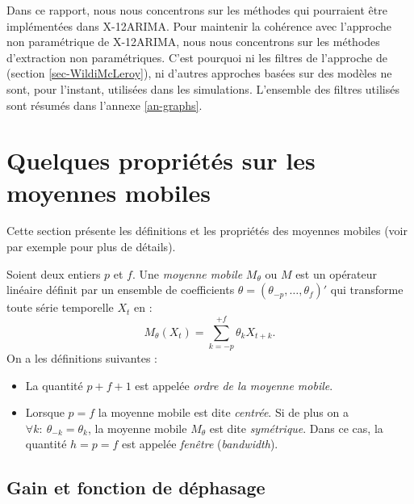 \documentclass[
  11pt,
  french,
  a4paper]{article}
\newcommand\1{\mathds{1}}
\begin{document}
Dans ce rapport, nous nous concentrons sur les méthodes qui pourraient être implémentées dans X-12ARIMA.
Pour maintenir la cohérence avec l'approche non paramétrique de X-12ARIMA, nous nous concentrons sur les méthodes d'extraction non paramétriques.
C'est pourquoi ni les filtres de l'approche de \textcite{trilemmaWMR2019} (section \ref{sec-WildiMcLeroy}), ni d'autres approches basées sur des modèles ne sont, pour l'instant, utilisées dans les simulations.
L'ensemble des filtres utilisés sont résumés dans l'annexe \ref{an-graphs}.

\hypertarget{sec-propMM}{%
\section{Quelques propriétés sur les moyennes mobiles}\label{sec-propMM}}

Cette section présente les définitions et les propriétés des moyennes mobiles (voir par exemple \textcite{ch12HBSA} pour plus de détails).

Soient deux entiers \(p\) et \(f\).
Une \emph{moyenne mobile} \(M_\theta\) ou \(M\) est un opérateur linéaire définit par un ensemble de coefficients \(\theta=(\theta_{-p},\dots,\theta_{f})'\) qui transforme toute série temporelle \(X_t\) en :
\[
M_\theta(X_t)=\sum_{k=-p}^{+f}\theta_kX_{t+k}.
\]
On a les définitions suivantes :

\begin{itemize}
\item
  La quantité \(p+f+1\) est appelée \emph{ordre de la moyenne mobile}.
\item
  Lorsque \(p=f\) la moyenne mobile est dite \emph{centrée}.
  Si de plus on a \(\forall k:\:\theta_{-k} = \theta_k\), la moyenne mobile \(M_\theta\) est dite \emph{symétrique}.
  Dans ce cas, la quantité \(h=p=f\) est appelée \emph{fenêtre} (\emph{bandwidth}).
\end{itemize}

\hypertarget{gain-et-fonction-de-duxe9phasage}{%
\subsection{Gain et fonction de déphasage}\label{gain-et-fonction-de-duxe9phasage}}
\end{document}
